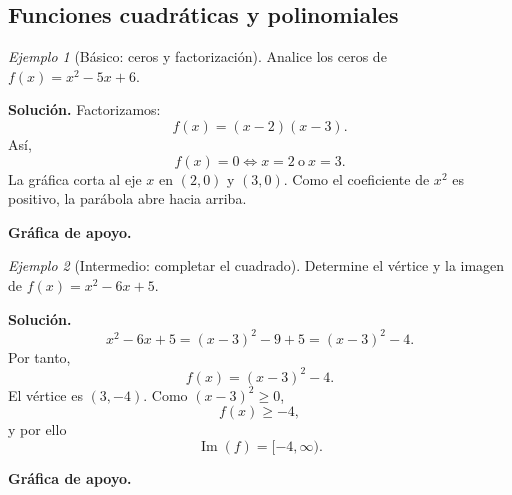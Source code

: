 \documentclass[12pt]{article}
\theoremstyle{remark}
\newtheorem{ejemplo}{Ejemplo}[section]
\newcommand{\Ima}{\operatorname{Im}}
\begin{document}
\subsection*{Funciones cuadráticas y polinomiales}

\begin{ejemplo}[Básico: ceros y factorización]
Analice los ceros de $f(x)=x^2-5x+6$.

\textbf{Solución.} Factorizamos:
\[
f(x)=(x-2)(x-3).
\]
Así,
\[
f(x)=0\Longleftrightarrow x=2\ \text{o}\ x=3.
\]
La gráfica corta al eje $x$ en $(2,0)$ y $(3,0)$. Como el coeficiente de $x^2$ es positivo, la parábola abre hacia arriba.


\textbf{Gráfica de apoyo.}\medskip
\begin{center}
\end{center}

\end{ejemplo}

\begin{ejemplo}[Intermedio: completar el cuadrado]
Determine el vértice y la imagen de $f(x)=x^2-6x+5$.

\textbf{Solución.}
\[
x^2-6x+5=(x-3)^2-9+5=(x-3)^2-4.
\]
Por tanto,
\[
\boxed{f(x)=(x-3)^2-4}.
\]
El vértice es $(3,-4)$. Como $(x-3)^2\ge0$,
\[
f(x)\ge-4,
\]
y por ello
\[
\boxed{\Ima(f)=[-4,\infty)}.
\]


\textbf{Gráfica de apoyo.}\medskip
\begin{center}
\end{center}

\end{ejemplo}
\end{document}
